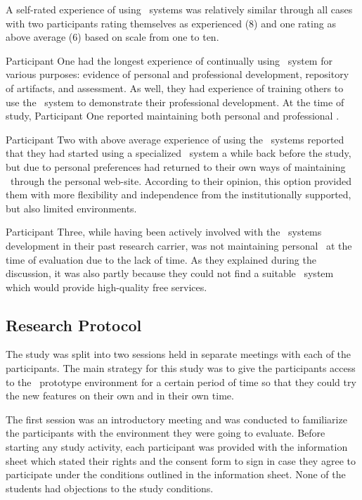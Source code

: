 A self-rated experience of using \ep~systems was relatively similar through all
cases with two participants rating themselves as experienced (8) and one rating
as above average (6) based on scale from one to ten.

Participant One had the longest experience of continually using \ep~system for
various purposes: evidence of personal and professional development, repository
of artifacts, and assessment. As well, they had experience of training others to
use the \ep~system to demonstrate their professional development. At the time of
study, Participant One reported maintaining both personal and professional \ep.

Participant Two with above average experience of using the \ep~systems reported
that they had started using a specialized \ep~system a while back before the
study, but due to personal preferences had returned to their own ways of 
maintaining \ep~through the personal web-site. According to their opinion, this
option provided them with more flexibility and independence from the
institutionally supported, but also limited environments.

Participant Three, while having been actively involved with the \ep~systems
development in their past research carrier, was not maintaining personal \ep~at
the time of evaluation due to the lack of time. As they explained during the
discussion, it was also partly because they could not find a suitable \ep~system
which would provide high-quality free services.

\subsection{Research Protocol}

The study was split into two sessions held in separate meetings with each of
the participants. The main strategy for this study was to give the participants
access to the \ep~prototype environment for a certain period of time so that
they could try the new features on their own and in their own time.

The first session was an introductory meeting and was conducted to familiarize
the participants with the environment they were going to evaluate. Before
starting any study activity, each participant was provided with the information
sheet which stated their rights and the consent form to sign in case they agree
to participate under the conditions outlined in the information sheet. None of
the students had objections to the study conditions.

